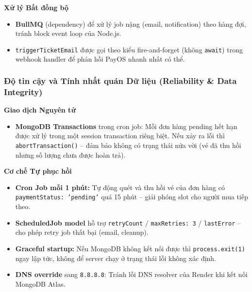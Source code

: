 \textbf{Xử lý Bất đồng bộ}

\begin{itemize}[leftmargin=*, label={--}]
    \item \textbf{BullMQ} (dependency) để xử lý job nặng (email, notification)
    theo hàng đợi, tránh block event loop của Node.js.

    \item \texttt{triggerTicketEmail} được gọi theo kiểu fire-and-forget
    (không \texttt{await}) trong webhook handler để phản hồi PayOS nhanh
    nhất có thể.
\end{itemize}

\subsubsection{Độ tin cậy và Tính nhất quán Dữ liệu (Reliability \& Data Integrity)}

\textbf{Giao dịch Nguyên tử}

\begin{itemize}[leftmargin=*, label={--}]
    \item \textbf{MongoDB Transactions} trong cron job: Mỗi đơn hàng pending
    hết hạn được xử lý trong một session transaction riêng biệt. Nếu xảy ra
    lỗi thì \texttt{abortTransaction()} -- đảm bảo không có trạng thái nửa
    vời (vé đã thu hồi nhưng số lượng chưa được hoàn trả).
\end{itemize}

\textbf{Cơ chế Tự phục hồi}

\begin{itemize}[leftmargin=*, label={--}]
    \item \textbf{Cron Job mỗi 1 phút:} Tự động quét và thu hồi vé của đơn
    hàng có \texttt{paymentStatus: 'pending'} quá 15 phút -- giải phóng slot
    cho người mua tiếp theo.

    \item \textbf{ScheduledJob model} hỗ trợ \texttt{retryCount} /
    \texttt{maxRetries: 3} / \texttt{lastError} -- cho phép retry job thất
    bại (email, cleanup).

    \item \textbf{Graceful startup:} Nếu MongoDB không kết nối được thì
    \texttt{process.exit(1)} ngay lập tức, không để server chạy ở trạng
    thái lỗi không xác định.

    \item \textbf{DNS override} sang \texttt{8.8.8.8}: Tránh lỗi DNS
    resolver của Render khi kết nối MongoDB Atlas.
\end{itemize}

